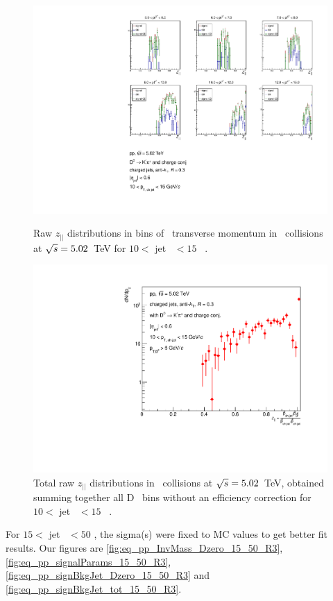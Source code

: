 \begin{figure}[bth]
\centering
\begin{minipage}{.65\textwidth}
  \centering
\includegraphics[width=\textwidth]{pp_2sig/R3_jetbin_10_15/jetRawSpectrum_pTD5}
\caption{Raw $z_{||}$ distributions in bins of \Dzero\ transverse momentum in \pp\ collisions at $\sqrt{s}=5.02$~TeV for $10<$ jet \pt\ $<15$ \GeVc\ .}
\label{fig:eq_pp_signBkgJet_Dzero_10_15_R3}
\end{minipage}%
\begin{minipage}{.4\textwidth}
  \centering
\includegraphics[width=\textwidth]{pp_2sig/R3_jetbin_10_15/jetPtSpectrum_SB_pTD5}
\caption{Total raw $z_{||}$ distributions in \pp\ collisions at $\sqrt{s}=5.02$~TeV, obtained summing together all D \pt\ bins without an efficiency correction for $10<$ jet \pt\ $<15$ \GeVc\ .
}
\label{fig:eq_pp_signBkgJet_tot_10_15_R3}
\end{minipage}
\end{figure}
For $15<$ jet \pt\ $<50$ \GeVc, the sigma(s) were fixed to MC values to get better fit results. Our figures are \ref{fig:eq_pp_InvMass_Dzero_15_50_R3}, \ref{fig:eq_pp_signalParams_15_50_R3}, \ref{fig:eq_pp_signBkgJet_Dzero_15_50_R3} and \ref{fig:eq_pp_signBkgJet_tot_15_50_R3}.

